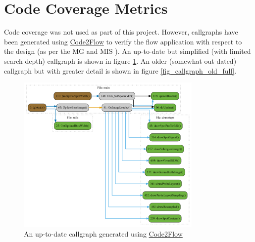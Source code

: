 \documentclass[12pt, titlepage]{article}
\begin{document}
\section{Code Coverage Metrics}
Code coverage was not used as part of this project. However, callgraphs have been generated using
\href{https://github.com/scottrogowski/code2flow}{Code2Flow}
to verify the flow application with respect to the design (as per the MG \cite{MG} and MIS \cite{MIS}).
An up-to-date but simplified (with limited search depth) callgraph is shown in figure \ref{fig_callgraph_simple}.
An older (somewhat out-dated) callgraph but with greater detail is shown in figure \ref{fig_callgraph_old_full}.

\begin{figure}[h!]
  \begin{center}
   \includegraphics[width=0.8\textwidth]{callgraph/simple.png}
  \caption{An up-to-date callgraph generated using \href{https://github.com/scottrogowski/code2flow}{Code2Flow}}
  \label{fig_callgraph_simple} 
  \end{center}
\end{figure}
\end{document}
